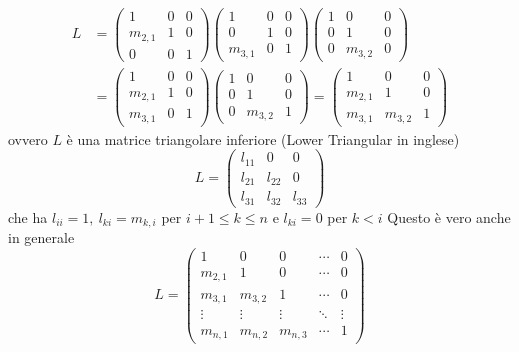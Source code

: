 \documentclass[12pt,a4paper]{article}
\begin{document}
    \[
    \begin{split}
        L &=
        \begin{pmatrix}
        1 & 0 & 0 \\
        m_{2,1} & 1 & 0 \\
        0 & 0 & 1
        \end{pmatrix}
        \begin{pmatrix}
        1 & 0 & 0 \\
        0 & 1 & 0 \\
        m_{3,1} & 0 & 1
        \end{pmatrix}
        \begin{pmatrix}
        1 & 0 & 0 \\
        0 & 1 & 0 \\
        0 & m_{3,2} & 0
        \end{pmatrix} \\
        &=
        \begin{pmatrix}
        1 & 0 & 0 \\
        m_{2,1} & 1 & 0 \\
        m_{3,1} & 0 & 1
        \end{pmatrix}
        \begin{pmatrix}
        1 & 0 & 0 \\
        0 & 1 & 0 \\
        0 & m_{3,2} & 1
        \end{pmatrix}
        =
        \begin{pmatrix}
        1 & 0 & 0 \\
        m_{2,1} & 1 & 0 \\
        m_{3,1} & m_{3,2} & 1
        \end{pmatrix}
    \end{split}
    \]
    ovvero $L$ è una matrice triangolare inferiore (Lower Triangular in inglese)
    \[
    L =
    \begin{pmatrix}
    l_{11} & 0 & 0 \\
    l_{21} & l_{22} & 0 \\
    l_{31} & l_{32} & l_{33}
    \end{pmatrix}
    \]
    che ha $l_{ii} = 1, \ l_{ki} = m_{k,i}$ per $i+1 \le k \le n$ e $l_{ki} = 0$ per $k<i$
Questo è vero anche in generale
\[
L=
\begin{pmatrix}
1 & 0 & 0 & \cdots & 0 \\
m_{2,1} & 1 & 0 & \cdots & 0 \\
m_{3,1} & m_{3,2} & 1 & \cdots & 0 \\
\vdots & \vdots & \vdots & \ddots & \vdots \\
m_{n,1} & m_{n,2} & m_{n,3} & \cdots & 1
\end{pmatrix}
\]
\end{document}
